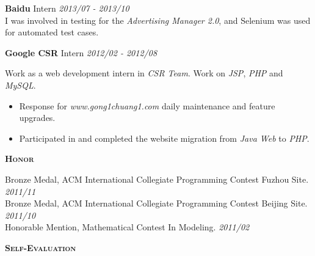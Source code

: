 \documentclass[a4paper]{article}
\newenvironment{changemargin}[2]{%
  \begin{list}{}{%
    \setlength{\topsep}{0pt}%
    \setlength{\leftmargin}{#1}%
    \setlength{\rightmargin}{#2}%
    \setlength{\listparindent}{\parindent}%
    \setlength{\itemindent}{\parindent}%
    \setlength{\parsep}{\parskip}%
  }%
  \item[]}{\end{list}
}
\newcommand{\lineover}{
	\begin{changemargin}{-0.05in}{-0.05in}
		\vspace*{-8pt}
		\hrulefill \\
		\vspace*{-2pt}
	\end{changemargin}
}
\newcommand{\header}[1]{
	\begin{changemargin}{-0.5in}{-0.5in}
		\scshape{\textbf{#1}}\\
	\end{changemargin}
}
\newenvironment{body} {
	\vspace*{-16pt}
	\begin{changemargin}{-0.5in}{-0.5in}
  }
	{\end{changemargin}
}
\begin{document}
\begin{body}
	\textbf{Baidu} \hfill Intern \emph{2013/07 - 2013/10}\\ 
	\smallskip
	I was involved in testing for the \emph{Advertising Manager 2.0}, and Selenium was used for automated test cases.
	\medskip
	
	\textbf{Google CSR} \hfill Intern \emph{2012/02 - 2012/08}\\ 
	\smallskip
	
	Work as a web development intern in \emph{CSR Team}. Work on \emph{JSP}, \emph{PHP} and \emph{MySQL}.
	\vspace*{-4pt}

	\begin{itemize} \itemsep -0pt  %
		\item Response for \emph{www.gong1chuang1.com} daily maintenance and feature upgrades.\\
	\end{itemize}
	\vspace*{-8pt}
	\begin{itemize} \itemsep -0pt  %
		\item Participated in and completed the website migration from \emph{Java Web} to \emph{PHP}.\\
	\end{itemize}

\end{body}

\medskip

\header{Honor}
\begin{body}
	\vspace{14pt}
	Bronze Medal, ACM International Collegiate Programming Contest Fuzhou Site. \hfill \emph{2011/11}\\
	Bronze Medal, ACM International Collegiate Programming Contest Beijing Site. \hfill \emph{2011/10}\\
	Honorable Mention, Mathematical Contest In Modeling. \hfill \emph{2011/02}\\
\end{body}

\medskip


\header{Self-Evaluation}
\end{document}
